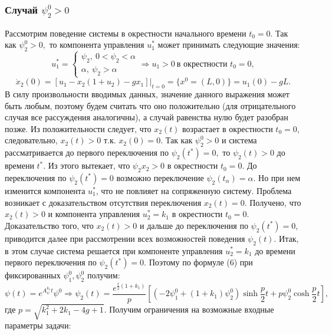 \documentclass[11pt]{article}
\begin{document}
{	 \subsubsection{Случай $\psi_2^0 > 0$}
	 {Рассмотрим поведение системы в окрестности начального времени $t_0 = 0.$ Так как $\psi_2^0 > 0,$ то компонента управления $u_1^*$ может принимать следующие значения:}
	 \[ u_1^* = \begin{cases}
	 \psi_2, \ 0 < \psi_2 < \alpha\\
	 \alpha, \ \psi_2 > \alpha
	 \end{cases} \Rightarrow u_1 > 0 \ \text{в окрестности }  t_0 = 0,\]
	 \[ \dot{x}_2(0) = [u_1 - x_2(1 + u_2)-gx_1]|_{t = 0} = \{x^0 = (L,0) \} = u_1(0) - gL. \]
	 {В силу произвольности вводимых данных, значение данного выражения может быть любым, поэтому будем считать что оно положительно (для отрицательного случая все рассуждения аналогичны), а случай равенства нулю будет разобран позже.}
	 \newline
	 {Из положительности следует, что $x_2(t)$ возрастает в окрестности $t_0 = 0$, следовательно, $x_2(t) > 0$ т.к. $x_2(0) = 0.$ Так как $\psi_2^0 > 0$ и система рассматривается до первого переключения по $\psi_2(t^*) = 0,$ то $ \psi_2(t) > 0$ до времени $t^*$. Из этого вытекает, что $\psi_2x_2 > 0$ в окрестности $t_0 = 0.$ }
	 \newline
	 {До переключения по $\psi_2(t^*) = 0$ возможно переключение $\psi_2(t_{\alpha}) = \alpha.$ Но при нем изменится компонента $u_1^*$, что не повлияет на сопряженную систему. Проблема возникает с доказательством отсутствия переключения $x_2(t) = 0.$ Получено, что $x_2(t) > 0$ и компонента управления $u_2^* = k_1$ в окрестности $t_0 = 0.$ Доказательство того, что $x_2(t) > 0$ и дальше до переключения по $\psi_2(t^*) = 0$, приводится далее при рассмотрении всех возможностей поведения $\psi_2(t)$.}
	 \newline
	 {Итак, в этом случае система решается при компоненте управления $u_2^* = k_1$ до времени первого переключения по $\psi_2(t^*) = 0.$ Поэтому по формуле (6) при фиксированных $\psi_1^0,\psi_2^0$ получим:}
	 \begin{equation}
	   \psi(t) = e^{A^{k_1}_\psi t}\psi^0 \Rightarrow \psi_2(t) = \frac{e^{\frac{t}{2}(1 + k_1)}}{p}[(-2\psi_1^0 + (1+k_1)\psi_2^0)\sinh\frac{p}{2}t + p\psi_2^0\cosh\frac{p}{2}t], 
	 \end{equation}
	 {где $p = \sqrt{k_1^2 + 2k_1 -4g + 1}.$ Получим ограничения на возможные входные параметры задачи:}
	 \begin{equation}

\end{equation}}
\end{document}
